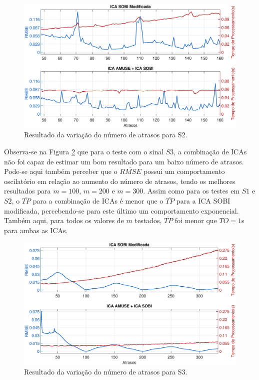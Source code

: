 \documentclass[a4paper,12pt]{monografia}
\theoremstyle{plain}
\theoremstyle{definition}
\theoremstyle{remark}
\begin{document}
\begin{figure}[!htb]
    \begin{center}
    \advance\leftskip -1.5cm
    \includegraphics[scale=0.45]{imagens/Sinal2Atrasov2.eps}
    \caption{Resultado da variação do número de atrasos para S2.}
    \label{fig:atrasoS2}
    \end{center}
\end{figure}

Observa-se na Figura \ref{fig:atrasoS3} que para o teste com o sinal $S3$, a combinação de ICAs não foi capaz de estimar um bom resultado para um baixo número de atrasos. Pode-se aqui também perceber que o $\overline{RMSE}$ possui um comportamento oscilatório em relação ao aumento do número de atrasos, tendo os melhores resultados para $m=100$, $m=200$ e $m=300$. Assim como para os testes em $S1$ e $S2$, o $\overline{TP}$ para a combinação de ICAs é menor que o $\overline{TP}$ para a ICA SOBI modificada, percebendo-se para este último um comportamento exponencial. Também aqui, para todos os valores de $m$ testados, $\overline{TP}$ foi menor que $TO=1$s para ambas as ICAs.

\begin{figure}[!htb]
    \begin{center}
    \advance\leftskip -1.5cm
    \includegraphics[scale=0.45]{imagens/Sinal3Atrasov2.eps}
    \caption{Resultado da variação do número de atrasos para S3.}
    \label{fig:atrasoS3}    
    \end{center}
\end{figure}
\end{document}
